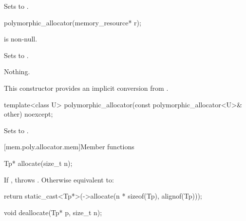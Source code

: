 \begin{itemdescr}
\pnum
\effects
Sets  to .
\end{itemdescr}

%
\begin{itemdecl}
polymorphic_allocator(memory_resource* r);
\end{itemdecl}

\begin{itemdescr}
\pnum
\expects
{} is non-null.

\pnum
\effects
Sets  to .

\pnum
\throws
Nothing.

\pnum
\begin{note}
This constructor provides an implicit conversion from .
\end{note}
\end{itemdescr}

%
\begin{itemdecl}
template<class U> polymorphic_allocator(const polymorphic_allocator<U>& other) noexcept;
\end{itemdecl}

\begin{itemdescr}
\pnum
\effects
Sets  to .
\end{itemdescr}


[mem.poly.allocator.mem]{Member functions}

%
\begin{itemdecl}
Tp* allocate(size_t n);
\end{itemdecl}

\begin{itemdescr}
\pnum
\effects
If ,
throws .
Otherwise equivalent to:
\begin{codeblock}
return static_cast<Tp*>(->allocate(n * sizeof(Tp), alignof(Tp)));
\end{codeblock}
\end{itemdescr}

%
\begin{itemdecl}
void deallocate(Tp* p, size_t n);
\end{itemdecl}

